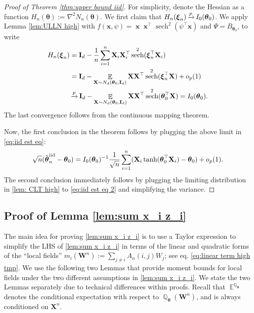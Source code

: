 \documentclass[preprint,reqno]{imsart}
\newcommand{\ttheta}{\boldsymbol{\theta}}
\newcommand{\I}{\mathbf{I}_{\mathnormal{d}}}
\DeclareMathOperator{\bx}{\textbf{x}}
\DeclareMathOperator{\xp}{\xrightarrow{\mathnormal p}}
\DeclareMathOperator{\sech}{sech}
\DeclareMathOperator{\EE}{\mathbb{E}}
\DeclareMathOperator{\QQ}{\mathbb{Q}}
\newcommand{\W}{\mathbf{W}}
\newcommand{\x}{\mathbf{x}}
\newcommand{\X}{\mathbf{X}}
\DeclareMathOperator{\sumin}{\sum_{\mathnormal i=1}^{\mathnormal n}}
\newcommand{\thetaiid}{\hat{\boldsymbol \theta}^{\text{iid}}_{\mathnormal n}}
\begin{document}
\begin{proof}[Proof of Theorem \ref{thm:upper bound iid}]
For simplicity, denote the Hessian as a function $H_n(\ttheta) := \nabla^2 N_n (\ttheta)$.
We first claim that $H_n(\boldsymbol{\xi}_n) \xp I_0(\ttheta_0)$.
We apply Lemma \ref{lem:ULLN high} with $f(\x,\psi) = \bx \bx^\top \sech^2(\psi^\top \x)$ and $\Psi = B_{\ttheta_0}$, to write 
\begin{align}
    H_n(\boldsymbol{\xi}_n) &= \I - \frac{1}{n}\sumin \X_i \X_i^\top \sech^2(\boldsymbol{\xi}_n^\top \X_i) \notag \\
    &= \I - \EE_{\X \sim N_d(\ttheta_0,\I)} \X \X^\top \sech^2(\boldsymbol{\xi}_n^\top \X) + o_p(1 ) \notag \\
    &\xp \I - \EE_{\X \sim N_d(\ttheta_0,\I)} \X \X^\top \sech^2(\ttheta_0^\top \X) = I_0(\ttheta_0). \label{eq:hessian convergence}
\end{align}
The last convergence follows from the continuous mapping theorem.

\vspace{2mm}
Now, the first conclusion in the theorem follows by plugging the above limit in \eqref{eq:iid est eq}:
\begin{equation}\label{eq:iid est eq 2}
    \sqrt{n}(\thetaiid - \ttheta_0) = I_0(\ttheta_0)^{-1} \frac{1}{\sqrt{n}} \sumin (\X_i \tanh(\ttheta_0^\top \X_i) - \ttheta_0) + o_p(1).
\end{equation}
%
%
The second conclusion immediately follows by plugging the limiting distribution in \cref{lem: CLT high} to \eqref{eq:iid est eq 2} and simplifying the variance.
\end{proof}

\subsection{Proof of Lemma \ref{lem:sum x_i z_i}}\label{proof:main lemma high tmp}
The main idea for proving \cref{lem:sum x_i z_i} is to use a Taylor expression to simplify the LHS of \eqref{lem:sum x_i z_i} in terms of the linear and quadratic forms of the ``local fields'' $m_i(\W^n) := \sum_{j \neq i} A_n(i,j) W_j$; see eq. \eqref{eq:linear term high tmp}. We use the following two Lemmas that provide moment bounds for local fields under the two different assumptions in \cref{lem:sum x_i z_i}. We state the two Lemmas separately due to technical differences within proofs.
%
Recall that $\EE^{\QQ_{\ttheta}}$ denotes the conditional expectation with respect to ${\QQ}_{\ttheta}(\W^n)$, and is always conditioned on $\X^n$.
\end{document}
